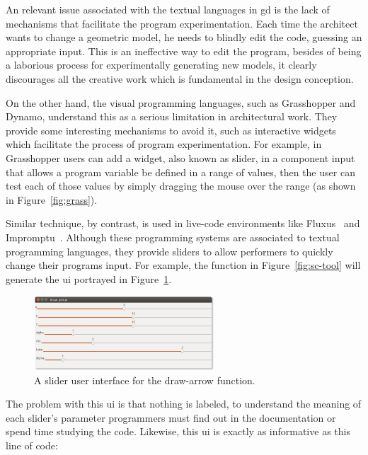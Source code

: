 An relevant issue associated with the textual languages in \gls{gd} is the lack of mechanisms that facilitate the program experimentation. Each time the architect wants to change a geometric model, he needs to blindly edit the code, guessing an appropriate input. This is an ineffective way to edit the program, besides of being a laborious process for experimentally generating new models, it clearly discourages all the creative work which is fundamental in the design conception.

On the other hand, the visual programming languages, such as Grasshopper and Dynamo, understand this as a serious limitation in architectural work. They provide some interesting mechanisms to avoid it, such as interactive widgets which facilitate the process of program experimentation. For example, in Grasshopper users can add a widget, also known as slider, in a component input that allows a program variable be defined in a range of values, then the user can test each of those values by simply dragging the mouse over the range  (as shown in Figure~\ref{fig:grass}).

Similar technique, by contrast, is used in live-code environments like Fluxus~\citep{griffiths2007fluxus} and Impromptu~\citep{sorensen2005impromptu}. Although these programming systems are associated to textual programming languages, they provide sliders to allow performers to quickly change their programs input. For example, the function in Figure~\ref{fig:sc-tool} will generate the \gls{ui} portrayed in Figure~\ref{fig:slider-ui}.  

\begin{figure}[!htbp]
  \centering
  \includegraphics[width=0.6\textwidth]{images/slider-sample}
    \caption{A slider user interface for the draw-arrow function.}
  \label{fig:slider-ui}
\end{figure}

The problem with this \gls{ui} is that nothing is labeled, to understand the meaning of each slider's parameter programmers must find out in the documentation or spend time studying the code. Likewise, this \gls{ui} is exactly as informative as this line of code:

